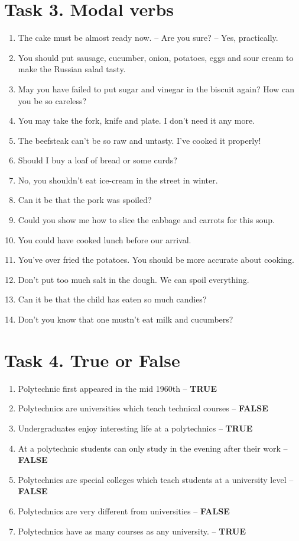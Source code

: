 \documentclass[a4paper,12pt]{report}
\begin{document}
\section*{Task 3. Modal verbs}
\begin{enumerate}
    \item{The cake must be almost ready now. – Are you sure? – Yes, practically.}
    \item{You should put sausage, cucumber, onion, potatoes, eggs and sour cream to make the Russian salad tasty.}
    \item{May you have failed to put sugar and vinegar in the biscuit again? How can you be so careless?}
    \item{You may take the fork, knife and plate. I don’t need it any more.}
    \item{The beefsteak can’t be so raw and untasty. I’ve cooked it properly!}
    \item{Should I buy a loaf of bread or some curds?}
    \item{No, you shouldn’t eat ice-cream in the street in winter.}
    \item{Can it be that the pork was spoiled?}
    \item{Could you show me how to slice the cabbage and carrots for this soup.}
    \item{You could have cooked lunch before our arrival.}
    \item{You’ve over fried the potatoes. You should be more accurate about cooking.}
    \item{Don’t put too much salt in the dough. We can spoil everything.}
    \item{Can it be that the child has eaten so much candies?}
    \item{Don’t you know that one mustn’t eat milk and cucumbers?}
\end{enumerate}

\section*{Task 4. True or False}
\begin{enumerate}
    \item{Polytechnic first appeared in the mid 1960th -- \textbf{TRUE}}
    \item{Polytechnics are universities which teach technical courses -- \textbf{FALSE}}
    \item{Undergraduates enjoy interesting life at a polytechnics -- \textbf{TRUE}}
    \item{At a polytechnic students can only study in the evening after their work -- \textbf{FALSE}}
    \item{Polytechnics are special colleges which teach students at a university level -- \textbf{FALSE}}
    \item{Polytechnics are very different from universities -- \textbf{FALSE}}
    \item{Polytechnics have as many courses as any university. -- \textbf{TRUE}}
\end{enumerate}
\end{document}
